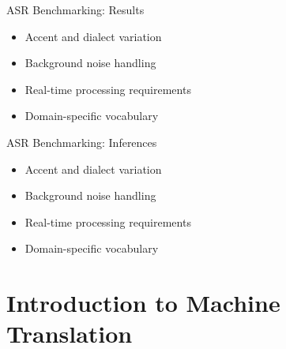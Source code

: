 \documentclass{beamer}
\begin{document}
\begin{frame}{ASR Benchmarking: Results}
\begin{itemize}
\item Accent and dialect variation
\item Background noise handling
\item Real-time processing requirements
\item Domain-specific vocabulary
\end{itemize}
\end{frame}

\begin{frame}{ASR Benchmarking: Inferences}
\begin{itemize}
\item Accent and dialect variation
\item Background noise handling
\item Real-time processing requirements
\item Domain-specific vocabulary
\end{itemize}
\end{frame}

\section{Introduction to Machine Translation}
\end{document}
